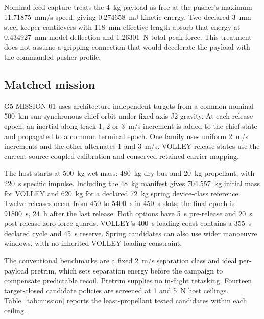 \documentclass[conference,a4paper]{IEEEtran}
\begin{document}
Nominal feed capture treats the 4~kg payload as free at the pusher's maximum 11.71875~mm/s speed, giving 0.274658~mJ kinetic energy. Two declared 3~mm steel keeper cantilevers with 118~mm effective length absorb that energy at 0.434927~mm model deflection and 1.26301~N total peak force. This treatment does not assume a gripping connection that would decelerate the payload with the commanded pusher profile.

\subsection{Matched mission}
G5-MISSION-01 uses architecture-independent targets from a common nominal 500~km sun-synchronous chief orbit under fixed-axis J2 gravity. At each release epoch, an inertial along-track 1, 2 or 3~m/s increment is added to the chief state and propagated to a common terminal epoch. One family uses uniform 2~m/s increments and the other alternates 1 and 3~m/s. VOLLEY release states use the current source-coupled calibration and conserved retained-carrier mapping.

The host starts at 500~kg wet mass: 480~kg dry bus and 20~kg propellant, with 220~s specific impulse. Including the 48~kg manifest gives 704.557~kg initial mass for VOLLEY and 620~kg for a declared 72~kg spring device-class reference. Twelve releases occur from 450 to 5400~s in 450~s slots; the final epoch is 91800~s, 24~h after the last release. Both options have 5~s pre-release and 20~s post-release zero-force guards. VOLLEY's 400~s loading coast contains a 355~s declared cycle and 45~s reserve. Spring candidates can also use wider manoeuvre windows, with no inherited VOLLEY loading constraint.

The conventional benchmarks are a fixed 2~m/s separation class and ideal per-payload pretrim, which sets separation energy before the campaign to compensate predictable recoil. Pretrim supplies no in-flight retasking. Fourteen target-closed candidate policies are screened at 1 and 5~N host ceilings. Table~\ref{tab:mission} reports the least-propellant tested candidates within each ceiling.
\end{document}
